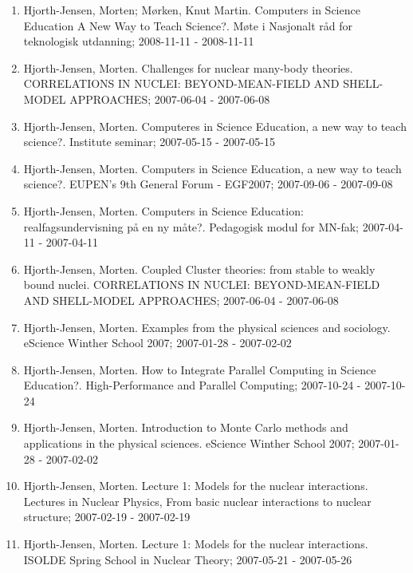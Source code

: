 \documentclass[%
oneside,                 %
final,                   %
10pt]{article}
\begin{document}
\begin{enumerate}
\item Hjorth-Jensen, Morten; Mørken, Knut Martin.  Computers in Science Education A New Way to Teach Science?. Møte i Nasjonalt råd for teknologisk utdanning; 2008-11-11 - 2008-11-11

\item Hjorth-Jensen, Morten.  Challenges for nuclear many-body theories. CORRELATIONS IN NUCLEI: BEYOND-MEAN-FIELD AND SHELL-MODEL APPROACHES; 2007-06-04 - 2007-06-08

\item Hjorth-Jensen, Morten.  Computeres in Science Education, a new way to teach science?. Institute seminar; 2007-05-15 - 2007-05-15

\item Hjorth-Jensen, Morten.  Computers in Science Education, a new way to teach science?. EUPEN's 9th General Forum - EGF2007; 2007-09-06 - 2007-09-08

\item Hjorth-Jensen, Morten.  Computers in Science Education: realfagsundervisning på en ny måte?. Pedagogisk modul for MN-fak; 2007-04-11 - 2007-04-11

\item Hjorth-Jensen, Morten.  Coupled Cluster theories: from stable to weakly bound nuclei. CORRELATIONS IN NUCLEI: BEYOND-MEAN-FIELD AND SHELL-MODEL APPROACHES; 2007-06-04 - 2007-06-08

\item Hjorth-Jensen, Morten.  Examples from the physical sciences and sociology. eScience Winther School 2007; 2007-01-28 - 2007-02-02

\item Hjorth-Jensen, Morten.  How to Integrate Parallel Computing in Science Education?. High-Performance and Parallel Computing; 2007-10-24 - 2007-10-24

\item Hjorth-Jensen, Morten.  Introduction to Monte Carlo methods and applications in the physical sciences. eScience Winther School 2007; 2007-01-28 - 2007-02-02

\item Hjorth-Jensen, Morten.  Lecture 1: Models for the nuclear interactions. Lectures in Nuclear Physics, From basic nuclear interactions to nuclear structure; 2007-02-19 - 2007-02-19

\item Hjorth-Jensen, Morten.  Lecture 1: Models for the nuclear interactions. ISOLDE Spring School in Nuclear Theory; 2007-05-21 - 2007-05-26


\end{enumerate}
\end{document}

